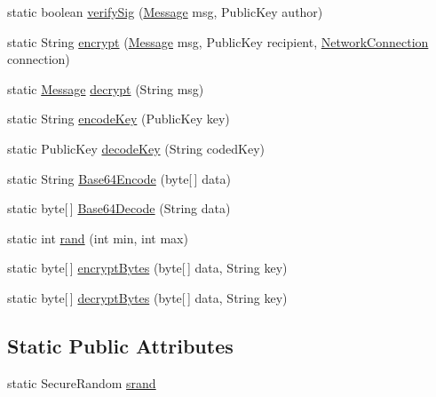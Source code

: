 \begin{DoxyCompactItemize}
\item 
static boolean \hyperlink{classballmerpeak_1_1turtlenet_1_1server_1_1Crypto_ae5bdc4040fce3773ce9d5718d3bf8d0b}{verify\-Sig} (\hyperlink{classballmerpeak_1_1turtlenet_1_1shared_1_1Message}{Message} msg, Public\-Key author)
\item 
static String \hyperlink{classballmerpeak_1_1turtlenet_1_1server_1_1Crypto_ae3b4ea7217b7e91abd1d42f932611c85}{encrypt} (\hyperlink{classballmerpeak_1_1turtlenet_1_1shared_1_1Message}{Message} msg, Public\-Key recipient, \hyperlink{classballmerpeak_1_1turtlenet_1_1server_1_1NetworkConnection}{Network\-Connection} connection)
\item 
static \hyperlink{classballmerpeak_1_1turtlenet_1_1shared_1_1Message}{Message} \hyperlink{classballmerpeak_1_1turtlenet_1_1server_1_1Crypto_a74c30e340ade0ff1729abe05c772d3f7}{decrypt} (String msg)
\item 
static String \hyperlink{classballmerpeak_1_1turtlenet_1_1server_1_1Crypto_ac3423c536327620f518dab7f55d85b20}{encode\-Key} (Public\-Key key)
\item 
static Public\-Key \hyperlink{classballmerpeak_1_1turtlenet_1_1server_1_1Crypto_a78b5adee9b8deda2f2558fcc9aa3aa4b}{decode\-Key} (String coded\-Key)
\item 
static String \hyperlink{classballmerpeak_1_1turtlenet_1_1server_1_1Crypto_a9a8cf56daec604a46eff71fd42b21eef}{Base64\-Encode} (byte\mbox{[}$\,$\mbox{]} data)
\item 
static byte\mbox{[}$\,$\mbox{]} \hyperlink{classballmerpeak_1_1turtlenet_1_1server_1_1Crypto_a9ff76fd9368082d0e3fa77c9687d8bee}{Base64\-Decode} (String data)
\item 
static int \hyperlink{classballmerpeak_1_1turtlenet_1_1server_1_1Crypto_a226d168b01eb7f6c9b1c5c0984528a41}{rand} (int min, int max)
\item 
static byte\mbox{[}$\,$\mbox{]} \hyperlink{classballmerpeak_1_1turtlenet_1_1server_1_1Crypto_abfc04f2d0f6f92bcca41c53b6cdc667d}{encrypt\-Bytes} (byte\mbox{[}$\,$\mbox{]} data, String key)
\item 
static byte\mbox{[}$\,$\mbox{]} \hyperlink{classballmerpeak_1_1turtlenet_1_1server_1_1Crypto_aea88564254a1c6c217042419f304c1ef}{decrypt\-Bytes} (byte\mbox{[}$\,$\mbox{]} data, String key)
\end{DoxyCompactItemize}
\subsection*{Static Public Attributes}
\begin{DoxyCompactItemize}
\item 
static Secure\-Random \hyperlink{classballmerpeak_1_1turtlenet_1_1server_1_1Crypto_ad2ae6688f871ae46b7a5ae98b35d7000}{srand}
\end{DoxyCompactItemize}


